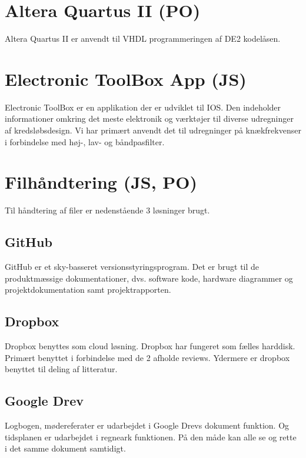 \section{Altera Quartus II (PO)}
Altera Quartus II er anvendt til VHDL programmeringen af DE2 kodelåsen.

\section{Electronic ToolBox App (JS)}
Electronic ToolBox er en applikation der er udviklet til IOS. Den indeholder informationer omkring det meste elektronik og værktøjer til diverse udregninger af kredsløbsdesign. Vi har primært anvendt det til udregninger på knækfrekvenser i forbindelse med høj-, lav- og båndpasfilter.  

\section{Filhåndtering (JS, PO)}
Til håndtering af filer er nedenstående 3 løsninger brugt. 

\subsection{GitHub}
GitHub er et sky-basseret versionsstyringsprogram. Det er brugt til de produktmæssige dokumentationer, dvs. software kode, hardware diagrammer og projektdokumentation samt projektrapporten.

\subsection{Dropbox}
Dropbox benyttes som cloud løsning. Dropbox har fungeret som fælles harddisk. Primært benyttet i forbindelse med de 2 afholde reviews. Ydermere er dropbox benyttet til deling af litteratur. 

\subsection{Google Drev}
Logbogen, mødereferater er udarbejdet i Google Drevs dokument funktion. Og tidsplanen er udarbejdet i regneark funktionen. På den måde kan alle se og rette i det samme dokument samtidigt. 


